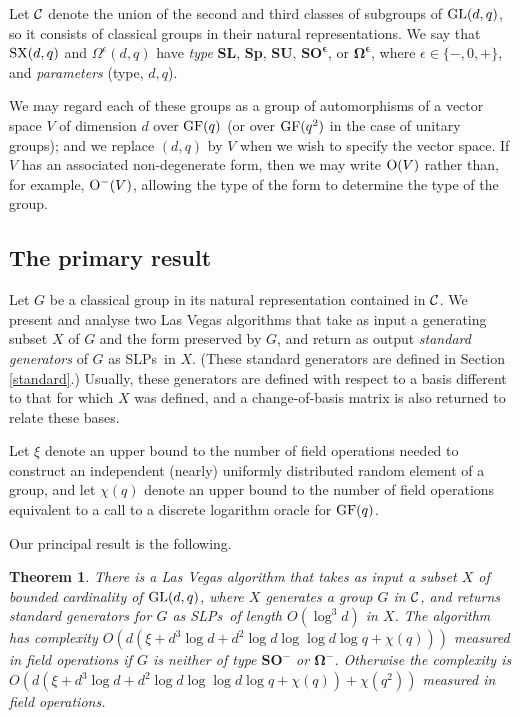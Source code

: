 \documentclass[12pt]{article}
\newtheorem{theorem}[definition]{Theorem}
\def\O{{\rm O}}  %
\def\GL{{\rm GL}}
\def\Oh{O}  %
\def\C{{\cal C}}
\def\GF{{\rm GF}}
\def\SX{{\rm SX}}
\def\SLPs{{\rm SLPs}}
\begin{document}
Let $\C$ denote the union of the second and third classes
of subgroups of $\GL(d, q)$, so it consists of classical
groups in their natural representations.
We say that $\SX(d, q)$ and $\Omega^\epsilon(d, q)$ have 
{\it type} {\bf SL}, {\bf Sp}, {\bf SU}, $\mathbf{SO^\epsilon}$, 
or $\mathbf{\Omega^\epsilon}$,
where $\epsilon \in \{-,0,+\}$, 
and {\it parameters} (type, $d, q$).

We may regard each of these groups as a group of automorphisms 
of a vector space $V$ of
dimension $d$ over $\GF(q)$ (or over $\GF(q^2)$ in the case of unitary groups); 
and we replace $(d,q)$ by $V$ when we wish to specify the vector space. 
If $V$ has an associated non-degenerate form, then we 
may write $\O(V)$ rather than, for example, $\O^-(V)$, allowing 
the type of the form to determine the type of the group.

\subsection{The primary result}
Let $G$ be a classical group in its natural representation 
contained in $\C$.
We present and analyse two Las Vegas algorithms that
take as input a generating subset $X$ of $G$ and 
the form preserved by $G$, 
and return as output {\it standard generators} of $G$ as 
\SLPs\ in $X$.  (These standard generators are defined
in Section \ref{standard}.) Usually, these  
generators are defined with respect to a 
basis different to that for which $X$ was defined, 
and a change-of-basis 
matrix is also returned to relate these bases.

Let $\xi$ denote an upper bound to the number of field operations 
needed to construct an independent
(nearly) uniformly distributed random element of a group,
and let $\chi(q)$ denote an upper bound to the 
number of field operations
equivalent to a call to a discrete logarithm oracle for $\GF(q)$.

Our principal result is the following.
\begin{theorem} \label{main}
There is a Las Vegas algorithm that takes as input a subset
$X$ of bounded cardinality of $\GL(d,q)$, where $X$ generates 
a group $G$ in $\C$, and 
returns standard generators for
$G$ as \SLPs\ of length $\Oh(\log^3 d)$ in $X$.
The algorithm has complexity 
$\Oh(d (\xi + d^3 \log d + d^2\log d \log\log d\log q+ \chi(q)))$ measured
in field operations if
$G$ is neither of type $\mathbf{SO^-}$ or $\mathbf{\Omega^-}$.  
Otherwise the complexity is 
$\Oh(d (\xi + d^3 \log d + d^2\log d\log\log d \log q + \chi(q))+\chi(q^2))$ 
measured in field operations.
\end{theorem}
\end{document}
